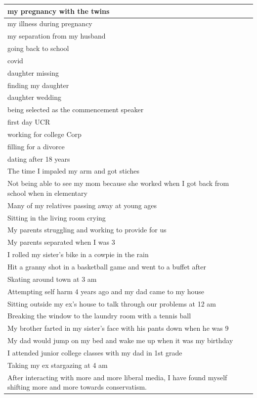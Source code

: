 \documentclass[
  .7em,
  letterpaper,
  DIV=11,
  numbers=noendperiod]{scrartcl}
\begin{document}
\begin{table}
\begin{tabular}{l}
\hline
my pregnancy with the twins\\
\hline
my illness during pregnancy\\
\hline
my separation from my husband\\
\hline
going back to school\\
\hline
covid\\
\hline
daughter missing\\
\hline
finding my daughter\\
\hline
daughter wedding\\
\hline
being selected as the commencement speaker\\
\hline
first day UCR\\
\hline
working for college Corp\\
\hline
filling for a divorce\\
\hline
dating after 18 years\\
\hline
The time I impaled my arm and got stiches\\
\hline
Not being able to see my mom because she worked when I got back from school when in elementary\\
\hline
Many of my relatives passing away at young ages\\
\hline
Sitting in the living room crying\\
\hline
My parents struggling and working to provide for us\\
\hline
My parents separated when I was 3\\
\hline
I rolled my sister's bike in a cowpie in the rain\\
\hline
Hit a granny shot in a basketball game and went to a buffet after\\
\hline
Skating around town at 3 am\\
\hline
Attempting self harm 4 years ago and my dad came to my house\\
\hline
Sitting outside my ex's house to talk through our problems at 12 am\\
\hline
Breaking the window to the laundry room with a tennis ball\\
\hline
My brother farted in my sister's face with his pants down when he was 9\\
\hline
My dad would jump on my bed and wake me up when it was my birthday\\
\hline
I attended junior college classes with my dad in 1st grade\\
\hline
Taking my ex stargazing at 4 am\\
\hline
After interacting with more and more liberal media, I have found myself shifting more and more towards conservatism.\\

\end{tabular}
\end{table}
\end{document}
